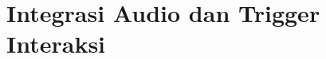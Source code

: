 \documentclass[../../main.tex]{subfiles}
\begin{document}
\chapter{Integrasi Audio dan Trigger Interaksi}
\label{chap:audio}
























\ifSubfilesClassLoaded{%
  \clearpage
}{}
\end{document}
